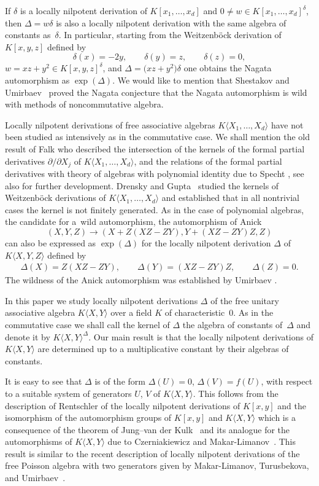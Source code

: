 \documentclass[10pt,a4paper]{amsart}
\numberwithin{equation}{section}
\begin{document}
If $\delta$ is a locally nilpotent derivation of $K[x_1,\ldots,x_d]$ and $0\not=w\in K[x_1,\ldots,x_d]^{\delta}$, then $\Delta=w\delta$ is also a locally nilpotent derivation with the same algebra of constants as~$\delta$. In particular, starting from the Weitzenb\"ock derivation of $K[x,y,z]$ defined by
\[
\delta(x)=-2y,\qquad \delta(y)=z,\qquad \delta(z)=0,
\]
$w=xz+y^2\in K[x,y,z]^{\delta}$, and $\Delta=\big(xz+y^2\big)\delta$ one obtains the Nagata automorphism as $\exp(\Delta)$. We would like to mention that Shestakov and Umirbaev~\cite{SU1, SU2} proved the Nagata conjecture that the Nagata automorphism is wild with methods of noncommutative algebra.

Locally nilpotent derivations of free associative algebras $K\langle X_1,\ldots,X_d\rangle$ have not been studied as intensively as in the commutative case. We shall mention the old result of Falk \cite{Fa} who described the intersection of the kernels of the formal partial derivatives $\partial/\partial X_j$ of $K\langle X_1,\ldots,X_d\rangle$, and the relations of the formal partial derivatives with theory of algebras with polynomial identity due to Specht \cite{Sp}, see also \cite{D1} for further development. Drensky and Gupta~\cite{DG} studied the kernels of Weitzenb\"ock derivations of $K\langle X_1,\ldots,X_d\rangle$ and established that in all nontrivial cases the kernel is not finitely generated. As in the case of polynomial algebras, the candidate for a~wild automorphism, the automorphism of Anick \cite[p.~343]{Co}
\[
(X,Y,Z)\to(X+Z(XZ-ZY),Y+(XZ-ZY)Z,Z)
\]
can also be expressed as $\exp(\Delta)$ for the locally nilpotent derivation $\Delta$ of $K\langle X,Y,Z\rangle$ defined by
\begin{gather*}%
\Delta(X)=Z(XZ-ZY),\qquad\Delta(Y)=(XZ-ZY)Z,\qquad\Delta(Z)=0.
\end{gather*}
The wildness of the Anick automorphism was established by Umirbaev \cite{U}.

In this paper we study locally nilpotent derivations $\Delta$ of the free unitary associative algebra $K\langle X,Y\rangle$ over a field $K$ of characteristic~0. As in the commutative case we shall call the kernel of $\Delta$ the algebra of constants of~$\Delta$ and denote it by $K\langle X,Y\rangle^{\Delta}$. Our main result is that the locally nilpotent derivations of $K\langle X,Y\rangle$ are determined up to a multiplicative constant by their algebras of constants.

It is easy to see that $\Delta$ is of the form $\Delta(U)=0$, $\Delta(V)=f(U)$, with respect to a suitable system of generators $U$, $V$ of $K\langle X,Y\rangle$. This follows from the description of Rentschler \cite{R} of the locally nilpotent derivations of $K[x,y]$ and the isomorphism of the automorphism groups of $K[x,y]$ and $K\langle X,Y\rangle$ which is a consequence of the theorem of Jung--van der Kulk~\cite{J, K} and its analogue for the automorphisms of $K\langle X,Y\rangle$ due to Czerniakiewicz \cite{Cz1, Cz2} and Makar-Limanov~\cite{ML}. This result is similar to the recent description of locally nilpotent derivations of the free Poisson algebra with two generators given by Makar-Limanov, Turusbekova, and Umirbaev~\cite{MLTU}.
\end{document}
